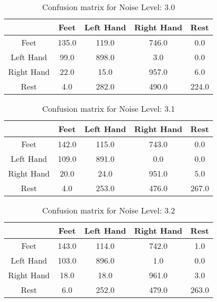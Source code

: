 \begin{table}[!htbp]
    \centering
    \begin{tabular}{|c||c|c|c|c|}
        \hline
		 & Feet & Left Hand & Right Hand & Rest \\
        \hline
        \hline
        Feet & 135.0 & 119.0 & 746.0 & 0.0 \\
        \hline
        Left Hand & 99.0 & 898.0 & 3.0 & 0.0 \\
        \hline
        Right Hand & 22.0 & 15.0 & 957.0 & 6.0 \\
        \hline
        Rest & 4.0 & 282.0 & 490.0 & 224.0 \\
        \hline
    \end{tabular}
    \caption{Confusion matrix for Noise Level: 3.0}
\end{table}

\begin{table}[!htbp]
    \centering
    \begin{tabular}{|c||c|c|c|c|}
        \hline
		 & Feet & Left Hand & Right Hand & Rest \\
        \hline
        \hline
        Feet & 142.0 & 115.0 & 743.0 & 0.0 \\
        \hline
        Left Hand & 109.0 & 891.0 & 0.0 & 0.0 \\
        \hline
        Right Hand & 20.0 & 24.0 & 951.0 & 5.0 \\
        \hline
        Rest & 4.0 & 253.0 & 476.0 & 267.0 \\
        \hline
    \end{tabular}
    \caption{Confusion matrix for Noise Level: 3.1}
\end{table}

\begin{table}[!htbp]
    \centering
    \begin{tabular}{|c||c|c|c|c|}
        \hline
		 & Feet & Left Hand & Right Hand & Rest \\
        \hline
        \hline
        Feet & 143.0 & 114.0 & 742.0 & 1.0 \\
        \hline
        Left Hand & 103.0 & 896.0 & 1.0 & 0.0 \\
        \hline
        Right Hand & 18.0 & 18.0 & 961.0 & 3.0 \\
        \hline
        Rest & 6.0 & 252.0 & 479.0 & 263.0 \\
        \hline
    \end{tabular}
    \caption{Confusion matrix for Noise Level: 3.2}
\end{table}

